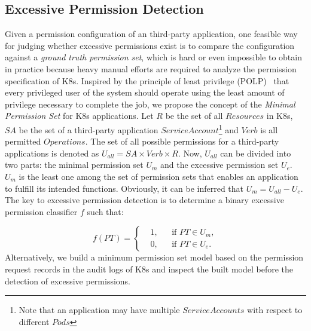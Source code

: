 \documentclass[conference]{IEEEtran}
\theoremstyle{definition}
\begin{document}
\subsection{Excessive Permission Detection} 
\label{sec:epd}

Given a permission configuration of an third-party application, one feasible way for judging whether excessive permissions exist is to compare the configuration against a \textit{ground truth permission set}, which is hard or even impossible to obtain in practice because heavy manual efforts are required to analyze the permission specification of K8s. Inspired by the principle of least privilege (POLP)~\cite{saltzer1975protection} that every privileged user of the system should operate using the least amount of privilege necessary to complete the job, we propose the concept of the \textit{Minimal Permission Set} for K8s applications. Let $R$ be the set of all $Resources$ in K8s, $SA$ be the set of a third-party application $ServiceAccount$\footnote{Note that an application may have multiple $ServiceAccounts$ with respect to different $Pods$} and $Verb$ is all permitted $Operations$. The set of all possible permissions for a third-party applications is denoted as $U_{all} = SA \times Verb \times R$. Now, $U_{all}$ can be divided into two parts: the minimal permission set $U_m$ and the excessive permission set $U_e$. $U_m$ is the least one among the set of permission sets that enables an application to fulfill its intended functions. Obviously, it can be inferred that \(U_m = U_{all} - U_e\). The key to excessive permission detection is to determine a binary excessive permission classifier $f$ such that:

\begin{equation}
\label{equ:classfierf}
f(PT) = \left\{
    \begin{aligned}
        &1, && \text{if } PT \in U_m, \\
        &0, && \text{if } PT \in U_e.
    \end{aligned}
\right.
\end{equation}
Alternatively, we build a minimum permission set model based on the permission request records in the audit logs of K8s and inspect the built model before the detection of excessive permissions.


\end{document}
